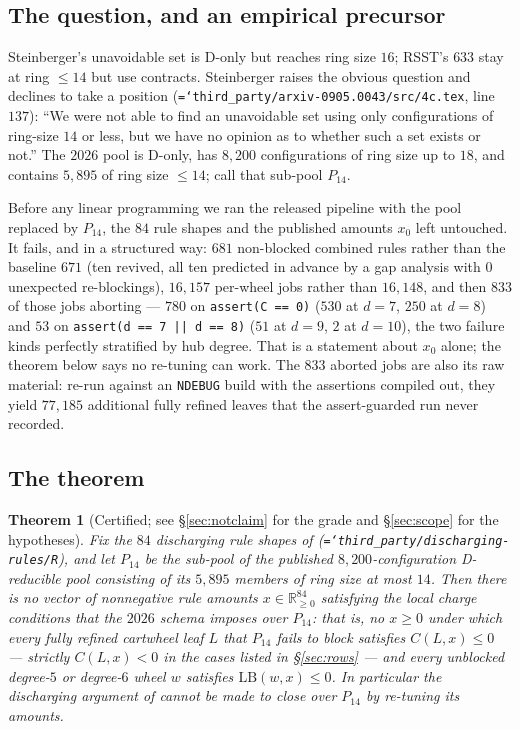 \documentclass[11pt]{article}
\newtheorem{theorem}{Theorem}[section]
\theoremstyle{definition}
\newcommand{\art}[1]{{\texttt{\hyphenchar\font=`\-\relax #1}}}
\newcommand{\LB}{\mathrm{LB}}
\begin{document}
\subsection{The question, and an empirical precursor}

Steinberger's unavoidable set \cite{steinberger2010} is D-only but reaches ring
size $16$; RSST's $633$ stay at ring $\le14$ but use contracts. Steinberger
raises the obvious question and declines to take a position
(\art{third\_party/arxiv-0905.0043/src/4c.tex}, line $137$): ``We were not able to
find an unavoidable set using only configurations of ring-size $14$ or less, but
we have no opinion as to whether such a set exists or not.'' The $2026$ pool
\cite{nl4ct2026} is D-only, has $8{,}200$ configurations of ring size up to $18$,
and contains $5{,}895$ of ring size $\le 14$; call that sub-pool $P_{14}$.

Before any linear programming we ran the released pipeline with the pool replaced
by $P_{14}$, the $84$ rule shapes and the published amounts $x_0$ left untouched.
It fails, and in a structured way: $681$ non-blocked combined rules rather than
the baseline $671$ (ten revived, all ten predicted in advance by a gap analysis
with $0$ unexpected re-blockings), $16{,}157$ per-wheel jobs rather than
$16{,}148$, and then $833$ of those jobs aborting --- $780$ on
\texttt{assert(C == 0)} ($530$ at $d=7$, $250$ at $d=8$) and $53$ on
\texttt{assert(d == 7 || d == 8)} ($51$ at $d=9$, $2$ at $d=10$), the two failure
kinds perfectly stratified by hub degree. That is a statement about $x_0$ alone;
the theorem below says no re-tuning can work. The $833$ aborted jobs are also its
raw material: re-run against an \texttt{NDEBUG} build with the assertions
compiled out, they yield $77{,}185$ additional fully refined leaves that the
assert-guarded run never recorded.

\subsection{The theorem}

\begin{theorem}[Certified; see \S\ref{sec:notclaim} for the grade and \S\ref{sec:scope} for the hypotheses]
\label{thm:lp}
Fix the $84$ discharging rule shapes of \cite{nl4ct2026}
(\art{third\_party/discharging-rules/R}), and let $P_{14}$ be the sub-pool of the
published $8{,}200$-configuration D-reducible pool consisting of its $5{,}895$
members of ring size at most $14$. Then there is no vector of nonnegative rule
amounts $x \in \mathbb{R}^{84}_{\ge0}$ satisfying the local charge conditions
that the $2026$ schema imposes over $P_{14}$: that is, no $x \ge 0$ under which
every fully refined cartwheel leaf $L$ that $P_{14}$ fails to block satisfies
$C(L,x) \le 0$ --- strictly $C(L,x)<0$ in the cases listed in \S\ref{sec:rows}
--- and every unblocked degree-$5$ or degree-$6$ wheel $w$ satisfies
$\LB(w,x)\le 0$. In particular the discharging argument of \cite{nl4ct2026}
cannot be made to close over $P_{14}$ by re-tuning its amounts.
\end{theorem}
\end{document}
